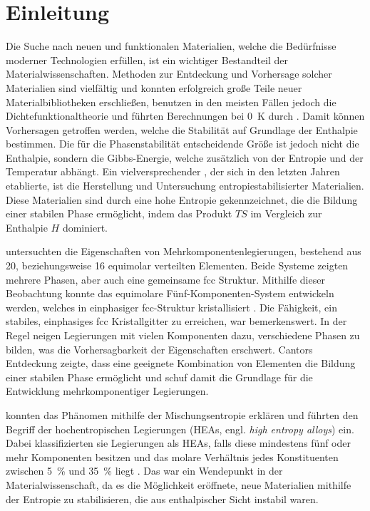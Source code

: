 \section{Einleitung}\label{sec:einleitung}
Die Suche nach neuen und funktionalen Materialien, welche die Bedürfnisse moderner Technologien erfüllen, ist ein
wichtiger Bestandteil der Materialwissenschaften.
Methoden zur Entdeckung und Vorhersage solcher Materialien sind vielfältig und konnten erfolgreich große Teile
neuer Materialbibliotheken erschließen, benutzen in den meisten Fällen jedoch die Dichtefunktionaltheorie und führten
Berechnungen bei \qty{0}{\kelvin} durch \autocite{Rost2015}.
Damit können Vorhersagen getroffen werden, welche die Stabilität auf Grundlage der Enthalpie bestimmen.
Die für die Phasenstabilität entscheidende Größe ist jedoch nicht die Enthalpie, sondern die Gibbs-Energie,
welche zusätzlich von der Entropie und der Temperatur abhängt.
Ein vielversprechender 
, der sich in den letzten Jahren etablierte, ist die Herstellung und
Untersuchung entropiestabilisierter Materialien.
Diese Materialien sind durch eine hohe Entropie gekennzeichnet, die die Bildung einer stabilen Phase ermöglicht, indem
das Produkt $TS$ im Vergleich zur Enthalpie $H$ dominiert.

 untersuchten die Eigenschaften von Mehrkomponentenlegierungen, bestehend aus 20, beziehungsweise 16
equimolar verteilten Elementen.
Beide Systeme zeigten mehrere Phasen, aber auch eine gemeinsame fcc Struktur.
Mithilfe dieser Beobachtung konnte das equimolare Fünf-Komponenten-System  entwickeln werden, welches in
einphasiger fcc-Struktur kristallisiert \autocite{cantor}.
Die Fähigkeit, ein stabiles, einphasiges fcc Kristallgitter zu erreichen, war bemerkenswert.
In der Regel neigen Legierungen mit vielen Komponenten dazu, verschiedene Phasen zu bilden, was die
Vorhersagbarkeit der Eigenschaften erschwert.
Cantors Entdeckung zeigte, dass eine geeignete Kombination von Elementen die Bildung einer stabilen Phase ermöglicht
und schuf damit die Grundlage für die Entwicklung mehrkomponentiger Legierungen.

 konnten das Phänomen mithilfe der Mischungsentropie erklären und führten den Begriff der
hochentropischen Legierungen (HEAs, engl. \textit{high entropy alloys}) ein.
Dabei klassifizierten sie Legierungen als HEAs, falls diese mindestens fünf oder mehr Komponenten besitzen
und das molare Verhältnis jedes Konstituenten zwischen \qty{5}{\percent} und \qty{35}{\percent} liegt \autocite{yeh}.
Das war ein Wendepunkt in der Materialwissenschaft, da es die Möglichkeit eröffnete, neue Materialien mithilfe
der Entropie zu stabilisieren, die aus enthalpischer Sicht instabil waren.


